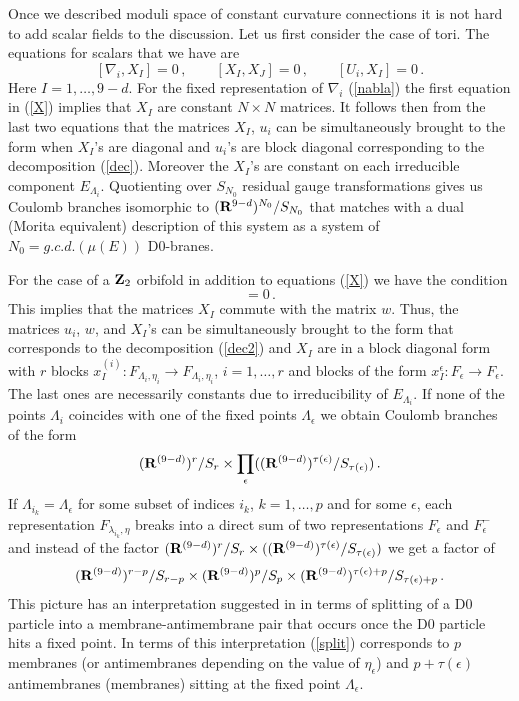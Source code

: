 \documentclass[a4paper,a4paper]{article}
\begin{document}
{Once we described moduli space of constant curvature connections it is not hard 
to add scalar fields to the discussion. Let us first consider the case of tori. The equations for scalars that we have are 
\begin{equation} \label{X}
[\nabla_{i}, X_{I}]= 0 \, , \qquad [X_{I}, X_{J}]=0 \, , \qquad [U_{i}, X_{I}]=0 \, .
\end{equation}
Here $I=1, \dots, 9-d$. 
For the fixed representation of $\nabla_{i}$ (\ref{nabla}) the first equation in (\ref{X}) implies that
 $X_{I}$ are constant $N\times N$ matrices. 
It follows then from the last two equations that the matrices $X_{I}$, $u_{i}$ can be simultaneously brought 
to the form when $X_{I}$'s are diagonal and $u_{i}$'s are block diagonal corresponding to the decomposition 
(\ref{dec}). Moreover the $X_{I}$'s are constant on each irreducible component $E_{\Lambda_{i}}$. Quotienting 
over $S_{N_{0}}$ residual gauge transformations gives us Coulomb branches isomorphic to $({\bf R}^{9-d})^{N_{0}}/S_{N_{0}}$ that 
matches with a dual (Morita equivalent) description of this system as a system
of $N_{0} = g.c.d.(\mu(E))$ D0-branes. 


For the case of a ${\bf Z}_{2}$ orbifold in addition to equations (\ref{X}) we have the condition 
\begin{equation}
[W, X_{I}] = 0 \, .
\end{equation}
This implies that the matrices $X_{I}$ commute with the matrix $w$. Thus, the matrices  $u_{i}$, $w$, and $X_{I}$'s can be 
simultaneously brought to the form that corresponds to the decomposition (\ref{dec2}) and $X_{I}$ are in a block diagonal 
form with $r$ blocks $x_{I}^{(i)}: F_{\Lambda_{i}, \eta_{i}} \to  F_{\Lambda_{i}, \eta_{i}}$, $i=1, \dots, r$ and 
blocks of the form $x_{I}^{\epsilon}: F_{\epsilon} \to  F_{\epsilon}$. The last ones are necessarily constants due to 
irreducibility of $E_{\Lambda_{i}}$. If none of the points $\Lambda_{i}$ coincides with one of the fixed points $\Lambda_{\epsilon}$ 
we obtain  Coulomb branches of the form 
$$
({\bf R}^{(9-d)})^{r}/S_{r}\times 
\prod_{\epsilon}(({\bf R}^{(9-d)})^{\tau(\epsilon )}/S_{\tau(\epsilon )} )\, .
$$ If $\Lambda_{i_{k}} = \Lambda_{\epsilon}$ for some 
subset of indices $i_{k}$, $k=1,\dots , p$  
and for some  $\epsilon$, each representation $F_{\lambda_{i_{k}}, \eta}$ breaks into a direct sum of two representations $F_{\epsilon}$ 
and $F_{\epsilon}^{-}$ and instead of the factor 
$({\bf R}^{(9-d)})^{r}/S_{r}\times 
(({\bf R}^{(9-d)})^{\tau(\epsilon )}/S_{\tau(\epsilon )} )$
we get a factor of 
\begin{equation} \label{split}
({\bf R}^{(9-d)})^{r-p}/S_{r-p}\times ({\bf R}^{(9-d)})^{p}/S_{p}\times ({\bf R}^{(9-d)})^{\tau(\epsilon )+ p}/S_{\tau(\epsilon )+p}  \, .
\end{equation} 
This picture has an interpretation suggested in \cite{RamgWald} 
in terms of splitting of a D0 particle into a membrane-antimembrane pair that occurs once the D0 particle hits a  fixed point. 
In terms of this interpretation (\ref{split}) corresponds to $p$ membranes (or antimembranes depending on the value of $\eta_{\epsilon}$) 
and $p+ \tau(\epsilon )$ antimembranes (membranes) sitting at the fixed point $\Lambda_{\epsilon}$. 
  

}
\end{document}
